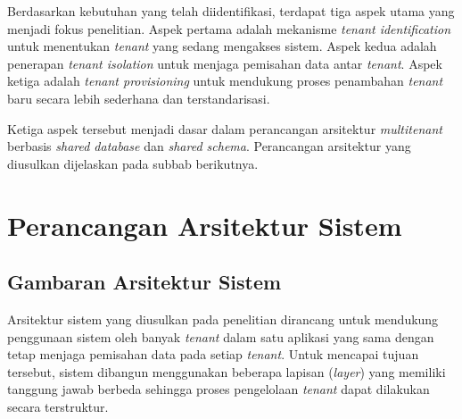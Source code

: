 Berdasarkan kebutuhan yang telah diidentifikasi, terdapat tiga aspek utama yang menjadi fokus penelitian. Aspek pertama adalah mekanisme \textit{tenant identification} untuk menentukan \textit{tenant} yang sedang mengakses sistem. Aspek kedua adalah penerapan \textit{tenant isolation} untuk menjaga pemisahan data antar \textit{tenant}. Aspek ketiga adalah \textit{tenant provisioning} untuk mendukung proses penambahan \textit{tenant} baru secara lebih sederhana dan terstandarisasi.

Ketiga aspek tersebut menjadi dasar dalam perancangan arsitektur \textit{multitenant} berbasis \textit{shared database} dan \textit{shared schema}. Perancangan arsitektur yang diusulkan dijelaskan pada subbab berikutnya.

\section{Perancangan Arsitektur Sistem}

\subsection{Gambaran Arsitektur Sistem}

Arsitektur sistem yang diusulkan pada penelitian dirancang untuk mendukung penggunaan sistem oleh banyak \textit{tenant} dalam satu aplikasi yang sama dengan tetap menjaga pemisahan data pada setiap \textit{tenant}. Untuk mencapai tujuan tersebut, sistem dibangun menggunakan beberapa lapisan (\textit{layer}) yang memiliki tanggung jawab berbeda sehingga proses pengelolaan \textit{tenant} dapat dilakukan secara terstruktur.

